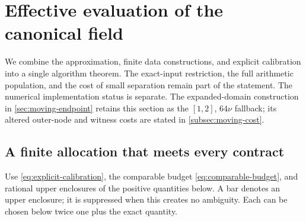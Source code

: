 \section{Effective evaluation of the canonical field}
\label{sec:effective}
We combine the approximation, finite data constructions, and explicit
calibration into a single algorithm theorem. The exact-input restriction,
the full arithmetic population, and the cost of small separation remain
part of the statement. The numerical implementation status is separate. The expanded-domain
construction in \cref{sec:moving-endpoint} retains this section as the
\([1,2]\), \(64\nu\) fallback; its altered outer-node and witness costs are
stated in \cref{subsec:moving-cost}.

\subsection{A finite allocation that meets every contract}
\label{subsec:finite-allocation}
Use \eqref{eq:explicit-calibration}, the comparable budget
\eqref{eq:comparable-budget}, and rational upper enclosures of the
positive quantities below. A bar denotes an upper enclosure; it is
suppressed when this creates no ambiguity. Each can be chosen below
twice one plus the exact quantity.


